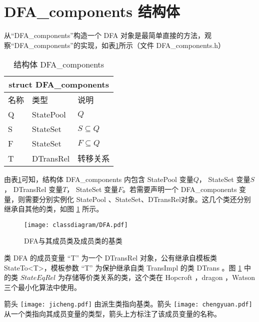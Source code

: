 \newpage
\section{DFA\_components 结构体}\label{sc:dfa_com}%

从“DFA\_components”构造一个 DFA 对象是最简单直接的方法，观察“DFA\_components”的实现，如表\ref{tab:DFA-components}所示（文件 DFA\_components.h）
\begin{table}[!htbp]
    \caption{结构体 DFA\_components}
    \label{tab:DFA-components}
    \centering
    \small%
    \setlength{\tabcolsep}{4pt}%
    \renewcommand{\arraystretch}{1.2}%
        \begin{tabular}{p{3em}<{\centering} p{5em}<{\raggedright} p{5em}<{\raggedright}} %
        \toprule 
         \multicolumn{3}{c}{struct DFA\_components} \\
        \midrule
        名称& 类型 & \mbox{说明} \\
        \midrule
        Q & StatePool &      $Q$     \\
        S & StateSet  &  $S\subseteq Q$ \\
        F & StateSet  &  $F\subseteq Q$ \\
        T & DTransRel &  转移关系  \\
        \bottomrule
    \end{tabular}
\end{table}

由表\ref{tab:DFA-components}可知，结构体 DFA\_components 内包含 StatePool 变量$Q$， StateSet 变量$S$， DTransRel 变量$T$， StateSet 变量$F$。若需要声明一个 DFA\_components 变量，则需要分别实例化 StatePool 、StateSet、DTransRel对象。这几个类还分别继承自其他的类，如图 \ref{fig:DFARel} 所示。

\begin{figure}[!htbp]
    \centering
    \texttt{[image: classdiagram/DFA.pdf]}
    \caption{DFA与其成员类及成员类的基类}
    \label{fig:DFARel}
\end{figure}

类 DFA 的成员变量 “T” 为一个 DTransRel 对象，公有继承自模板类 StateTo<T>，模板参数 “T” 为保护继承自类 TransImpl 的类 DTrans 。图 \ref{fig:DFARel} 中的类 $StateEqRel$ 为存储等价类关系的类，这个类在 Hopcroft ，dragon ，Watson 三个最小化算法中使用。

箭头 \texttt{[image: jicheng.pdf]} 由派生类指向基类。箭头 \texttt{[image: chengyuan.pdf]} 从一个类指向其成员变量的类型，箭头上方标注了该成员变量的名称。

